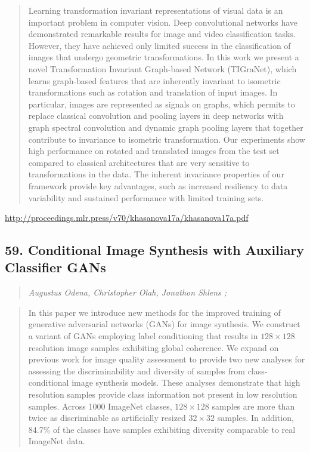 \documentclass{article}
\begin{document}
\begin{quote}
    Learning transformation invariant representations of visual data is an important problem in computer vision. Deep convolutional networks have demonstrated remarkable results for image and video classification tasks. However, they have achieved only limited success in the classification of images that undergo geometric transformations. In this work we present a novel Transformation Invariant Graph-based Network (TIGraNet), which learns graph-based features that are inherently invariant to isometric transformations such as rotation and translation of input images. In particular, images are represented as signals on graphs, which permits to replace classical convolution and pooling layers in deep networks with graph spectral convolution and dynamic graph pooling layers that together contribute to invariance to isometric transformation. Our experiments show high performance on rotated and translated images from the test set compared to classical architectures that are very sensitive to transformations in the data. The inherent invariance properties of our framework provide key advantages, such as increased resiliency to data variability and sustained performance with limited training sets.  \end{quote}

\href{http://proceedings.mlr.press/v70/khasanova17a/khasanova17a.pdf}{http://proceedings.mlr.press/v70/khasanova17a/khasanova17a.pdf}

\subsection{59. Conditional Image Synthesis with Auxiliary Classifier GANs}

\begin{quote}
\footnotesize{\textit{Augustus Odena, Christopher Olah, Jonathon Shlens ;}}
\end{quote}

\begin{quote}
    In this paper we introduce new methods for the improved training of generative adversarial networks (GANs) for image synthesis. We construct a variant of GANs employing label conditioning that results in $128\times 128$ resolution image samples exhibiting global coherence. We expand on previous work for image quality assessment to provide two new analyses for assessing the discriminability and diversity of samples from class-conditional image synthesis models. These analyses demonstrate that high resolution samples provide class information not present in low resolution samples. Across 1000 ImageNet classes, $128\times 128$ samples are more than twice as discriminable as artificially resized $32\times 32$ samples. In addition, 84.7\% of the classes have samples exhibiting diversity comparable to real ImageNet data.  \end{quote}
\end{document}

